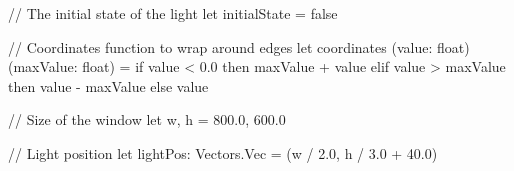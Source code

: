 
// The initial state of the light
let initialState = false


// Coordinates function to wrap around edges
let coordinates (value: float) (maxValue: float) =
    if value < 0.0 then maxValue + value
    elif value > maxValue then value - maxValue
    else value

// Size of the window
let w, h = 800.0, 600.0

// Light position
let lightPos: Vectors.Vec = (w / 2.0, h / 3.0 + 40.0)
